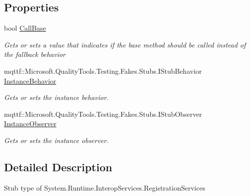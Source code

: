 \subsection*{Properties}
\begin{DoxyCompactItemize}
\item 
bool \hyperlink{class_system_1_1_runtime_1_1_interop_services_1_1_fakes_1_1_stub_registration_services_afc80296ac69397d7ae53b21fcb2fc29c}{Call\-Base}
\begin{DoxyCompactList}\small\item\em Gets or sets a value that indicates if the base method should be called instead of the fallback behavior\end{DoxyCompactList}\item 
mqttf\-::\-Microsoft.\-Quality\-Tools.\-Testing.\-Fakes.\-Stubs.\-I\-Stub\-Behavior \hyperlink{class_system_1_1_runtime_1_1_interop_services_1_1_fakes_1_1_stub_registration_services_a2c859bd312a0b4ddd2cacfc623812dde}{Instance\-Behavior}
\begin{DoxyCompactList}\small\item\em Gets or sets the instance behavior.\end{DoxyCompactList}\item 
mqttf\-::\-Microsoft.\-Quality\-Tools.\-Testing.\-Fakes.\-Stubs.\-I\-Stub\-Observer \hyperlink{class_system_1_1_runtime_1_1_interop_services_1_1_fakes_1_1_stub_registration_services_a004dc6bffc53edd02ca4081497ad2519}{Instance\-Observer}
\begin{DoxyCompactList}\small\item\em Gets or sets the instance observer.\end{DoxyCompactList}\end{DoxyCompactItemize}


\subsection{Detailed Description}
Stub type of System.\-Runtime.\-Interop\-Services.\-Registration\-Services



